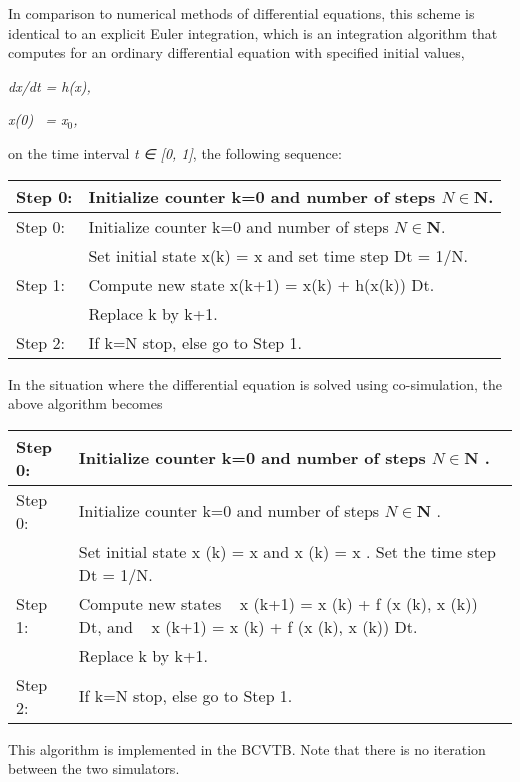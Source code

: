 In comparison to numerical methods of differential equations, this scheme is identical to an explicit Euler integration, which is an integration algorithm that computes for an ordinary differential equation with specified initial values,

\emph{dx/dt = h(x),}

\emph{x(0)~ = x\(_{0}\),}

on the time interval \emph{t} \emph{∈ {[}0, 1{]}}, the following sequence:

\begin{longtable}[c]{p{1.5in}p{4.5in}}
\toprule 
Step 0: & Initialize counter k=0 and number of steps \(N \in \mathbf{N}\). \tabularnewline
\endfirsthead

\toprule 
Step 0: & Initialize counter k=0 and number of steps \(N \in \mathbf{N}\). \tabularnewline
\endhead

~ & Set initial state x(k) = x and set time step Dt = 1/N. \tabularnewline
Step 1: & Compute new state x(k+1) = x(k) + h(x(k)) Dt. \tabularnewline
~ & Replace k by k+1. \tabularnewline
Step 2: & If k=N stop, else go to Step 1. \tabularnewline
\bottomrule
\end{longtable}

In the situation where the differential equation is solved using co-simulation, the above algorithm becomes

\begin{longtable}[c]{p{1.5in}p{4.5in}}
\toprule 
Step 0: & Initialize counter k=0 and number of steps $N \in \mathbf{N}$ . \tabularnewline
\midrule
\endfirsthead

\toprule 
Step 0: & Initialize counter k=0 and number of steps $N \in \mathbf{N}$ . \tabularnewline
\midrule
\endhead

~ & Set initial state x  (k) = x   and x  (k) = x  . Set the time step Dt = 1/N. \tabularnewline
Step 1: & Compute new states ~ x  (k+1) = x  (k) + f  (x  (k), x  (k)) Dt, and ~ x  (k+1) = x  (k) + f  (x  (k), x  (k)) Dt. \tabularnewline
~ & Replace k by k+1. \tabularnewline
Step 2: & If k=N stop, else go to Step 1. \tabularnewline
\bottomrule
\end{longtable}

This algorithm is implemented in the BCVTB. Note that there is no iteration between the two simulators.
